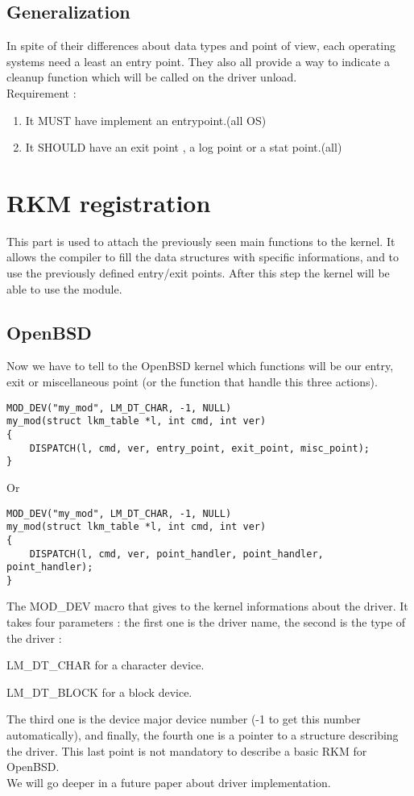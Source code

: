\documentclass[11pt]{report}
\begin{document}
  \subsection{Generalization}
  In spite of their differences about data types and point of view, each
  operating systems need a least an entry point.
  They also all provide a way to indicate a cleanup function which will be
  called on the driver unload.\\
  Requirement :
  \begin{enumerate}
	\item It MUST have implement an entrypoint.(all OS)
	\item It SHOULD have an exit point , a log point or a stat point.(all)
  \end{enumerate}

\newpage
\section{RKM registration}
This part is used to attach the previously seen main functions to the kernel.
It allows the compiler to fill the data structures with specific informations,
and to use the previously defined entry/exit points. After this step the
kernel will be able to use the module.

  \subsection{OpenBSD}
Now we have to tell to the OpenBSD kernel which functions will be our entry,
exit or miscellaneous point (or the function that handle this three actions).
    \begin{lstlisting}
MOD_DEV("my_mod", LM_DT_CHAR, -1, NULL)
my_mod(struct lkm_table *l, int cmd, int ver)
{
    DISPATCH(l, cmd, ver, entry_point, exit_point, misc_point);
}
    \end{lstlisting}
Or
    \begin{lstlisting}
MOD_DEV("my_mod", LM_DT_CHAR, -1, NULL)
my_mod(struct lkm_table *l, int cmd, int ver)
{
    DISPATCH(l, cmd, ver, point_handler, point_handler, point_handler);
}
    \end{lstlisting}
The MOD\_DEV macro that gives to the kernel informations about the driver.
It takes four parameters : the first one is the driver name, the second is
the type of the driver :
\begin{description}
\item{LM\_DT\_CHAR for a character device.}
\item{LM\_DT\_BLOCK for a block device.}
\end{description}
The third one is the device major device number (-1 to get this number automatically),
and finally, the fourth one is a pointer to a structure describing the driver.
This last point is not mandatory to describe a basic RKM for OpenBSD.\\
We will go deeper in a future paper about driver implementation.
\end{document}
